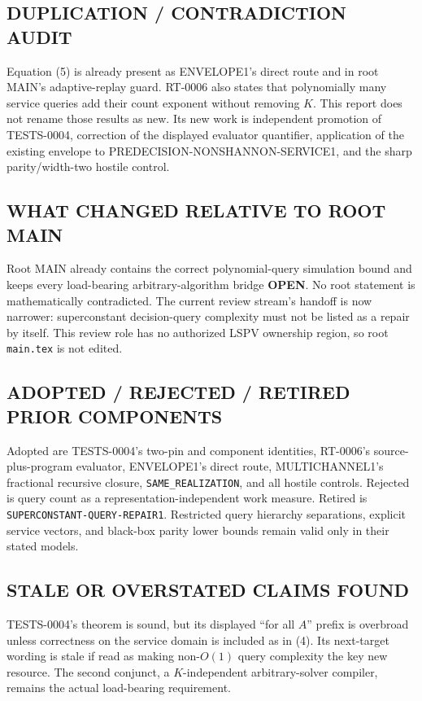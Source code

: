 \documentclass[11pt]{article}
\newcommand{\OPEN}{\textbf{OPEN}}
\begin{document}
\subsection*{DUPLICATION / CONTRADICTION AUDIT}
Equation (5) is already present as ENVELOPE1's direct route and in root MAIN's
adaptive-replay guard.  RT-0006 also states that polynomially many service
queries add their count exponent without removing $K$.  This report does not
rename those results as new.  Its new work is independent promotion of
TESTS-0004, correction of the displayed evaluator quantifier, application of
the existing envelope to PREDECISION-NONSHANNON-SERVICE1, and the sharp
parity/width-two hostile control.

\subsection*{WHAT CHANGED RELATIVE TO ROOT MAIN}
Root MAIN already contains the correct polynomial-query simulation bound and
keeps every load-bearing arbitrary-algorithm bridge \OPEN.  No root statement
is mathematically contradicted.  The current review stream's handoff is now
narrower: superconstant decision-query complexity must not be listed as a
repair by itself.  This review role has no authorized LSPV ownership region,
so root \texttt{main.tex} is not edited.

\subsection*{ADOPTED / REJECTED / RETIRED PRIOR COMPONENTS}
Adopted are TESTS-0004's two-pin and component identities, RT-0006's
source-plus-program evaluator, ENVELOPE1's direct route, MULTICHANNEL1's
fractional recursive closure, \texttt{SAME\_REALIZATION}, and all hostile controls.
Rejected is query count as a representation-independent work measure.
Retired is \texttt{SUPERCONSTANT-QUERY-REPAIR1}.  Restricted query hierarchy
separations, explicit service vectors, and black-box parity lower bounds
remain valid only in their stated models.

\subsection*{STALE OR OVERSTATED CLAIMS FOUND}
TESTS-0004's theorem is sound, but its displayed ``for all $A$'' prefix is
overbroad unless correctness on the service domain is included as in (4).
Its next-target wording is stale if read as making non-$O(1)$ query complexity
the key new resource.  The second conjunct, a $K$-independent arbitrary-solver
compiler, remains the actual load-bearing requirement.
\end{document}
